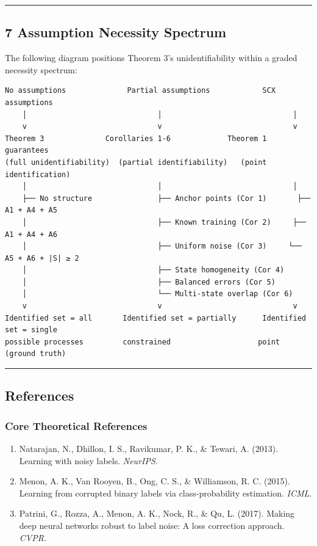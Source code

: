 \documentclass[
  12pt,
]{ctexart}
\providecommand{\tightlist}{%
  \setlength{\itemsep}{0pt}\setlength{\parskip}{0pt}}
\begin{document}
\begin{center}\rule{0.5\linewidth}{0.5pt}\end{center}

\subsection{7 Assumption Necessity
Spectrum}\label{assumption-necessity-spectrum}

The following diagram positions Theorem 3's unidentifiability within a
graded necessity spectrum:

\begin{verbatim}
No assumptions              Partial assumptions            SCX assumptions
    │                              │                              │
    v                              v                              v
Theorem 3              Corollaries 1-6             Theorem 1 guarantees
(full unidentifiability)  (partial identifiability)   (point identification)
    │                              │                              │
    ├── No structure               ├── Anchor points (Cor 1)       ├── A1 + A4 + A5
    │                              ├── Known training (Cor 2)     ├── A1 + A4 + A6
    │                              ├── Uniform noise (Cor 3)     └── A5 + A6 + |S| ≥ 2
    │                              ├── State homogeneity (Cor 4)
    │                              ├── Balanced errors (Cor 5)
    │                              └── Multi-state overlap (Cor 6)
    v                              v                              v
Identified set = all       Identified set = partially      Identified set = single
possible processes         constrained                    point (ground truth)
\end{verbatim}

\begin{center}\rule{0.5\linewidth}{0.5pt}\end{center}

\subsection{References}\label{references}

\subsubsection{Core Theoretical
References}\label{core-theoretical-references}

\begin{enumerate}
\def\labelenumi{\arabic{enumi}.}
\tightlist
\item
  Natarajan, N., Dhillon, I. S., Ravikumar, P. K., \& Tewari, A. (2013).
  Learning with noisy labels. \emph{NeurIPS}.
\item
  Menon, A. K., Van Rooyen, B., Ong, C. S., \& Williamson, R. C. (2015).
  Learning from corrupted binary labels via class-probability
  estimation. \emph{ICML}.
\item
  Patrini, G., Rozza, A., Menon, A. K., Nock, R., \& Qu, L. (2017).
  Making deep neural networks robust to label noise: A loss correction
  approach. \emph{CVPR}.
\end{enumerate}
\end{document}
